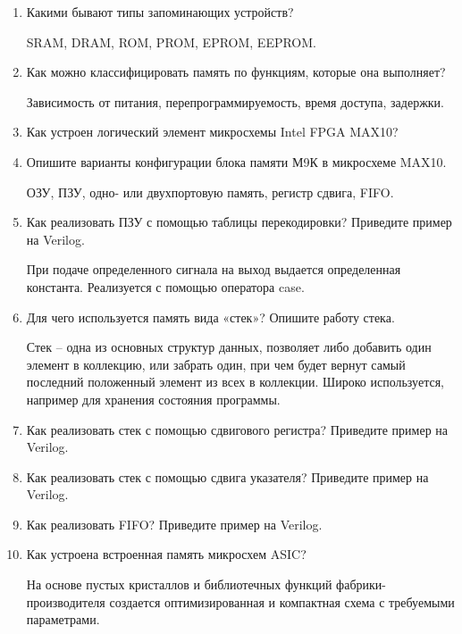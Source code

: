 \documentclass[a4paper,14pt]{article}
\begin{document}
\begin{enumerate}
		\item Какими бывают типы запоминающих устройств?
		
		SRAM, DRAM, ROM, PROM, EPROM, EEPROM.
		
		\item Как можно классифицировать память по функциям, которые она выполняет?
		
		Зависимость от питания, перепрограммируемость, время доступа, задержки.
		
		\item Как устроен логический элемент микросхемы Intel FPGA MAX10?
		
		\item Опишите варианты конфигурации блока памяти М9К в микросхеме MAX10.
		
		ОЗУ, ПЗУ, одно- или двухпортовую память, регистр сдвига, FIFO.
		
		\item Как реализовать ПЗУ с помощью таблицы перекодировки? Приведите пример на Verilog.
		
		При подаче определенного сигнала на выход выдается определенная константа.
		Реализуется с помощью оператора case.
		
		\item Для чего используется память вида «стек»? Опишите работу стека.
		
		Стек -- одна из основных структур данных, позволяет либо добавить один элемент в коллекцию, или забрать один, при чем будет вернут самый последний положенный элемент из всех в коллекции.
		Широко используется, например для хранения состояния программы.
		
		\item Как реализовать стек с помощью сдвигового регистра? Приведите пример на Verilog.
		
		\item Как реализовать стек с помощью сдвига указателя? Приведите пример на Verilog.
		
		\item Как реализовать FIFO? Приведите пример на Verilog.
		
		\item Как устроена встроенная память микросхем ASIC?
		
		На основе пустых кристаллов и библиотечных функций фабрики-производителя создается оптимизированная и компактная схема с требуемыми параметрами.
		
	\end{enumerate}
	
\end{document}
